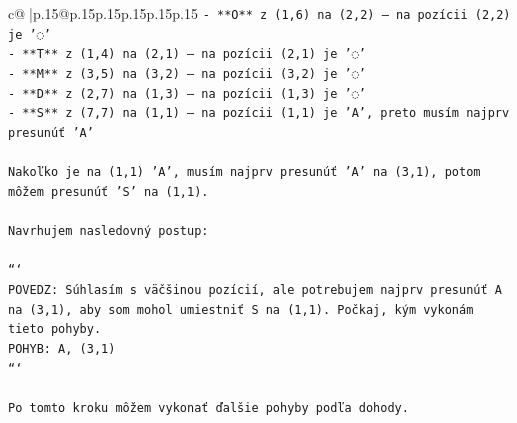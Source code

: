 \documentclass{article}
\begin{document}
{\begin{supertabular}{c@{$\;$}|p{.15\linewidth}@{}p{.15\linewidth}p{.15\linewidth}p{.15\linewidth}p{.15\linewidth}p{.15\linewidth}}
{{{\texttt{{-} **O** z (1,6) na (2,2) – na pozícii (2,2) je '◌'} \\
\texttt{{-} **T** z (1,4) na (2,1) – na pozícii (2,1) je '◌'} \\
\texttt{{-} **M** z (3,5) na (3,2) – na pozícii (3,2) je '◌'} \\
\texttt{{-} **D** z (2,7) na (1,3) – na pozícii (1,3) je '◌'} \\
\texttt{{-} **S** z (7,7) na (1,1) – na pozícii (1,1) je 'A', preto musím najprv presunúť 'A'} \\
\\ 
\texttt{Nakoľko je na (1,1) 'A', musím najprv presunúť 'A' na (3,1), potom môžem presunúť 'S' na (1,1).} \\
\\ 
\texttt{Navrhujem nasledovný postup:} \\
\\ 
\texttt{```} \\
\texttt{POVEDZ: Súhlasím s väčšinou pozícií, ale potrebujem najprv presunúť A na (3,1), aby som mohol umiestniť S na (1,1). Počkaj, kým vykonám tieto pohyby.} \\
\texttt{POHYB: A, (3,1)} \\
\texttt{```} \\
\\ 
\texttt{Po tomto kroku môžem vykonať ďalšie pohyby podľa dohody.} \\
            }
        }
    }
     \\ \\


\end{supertabular}}
\end{document}
